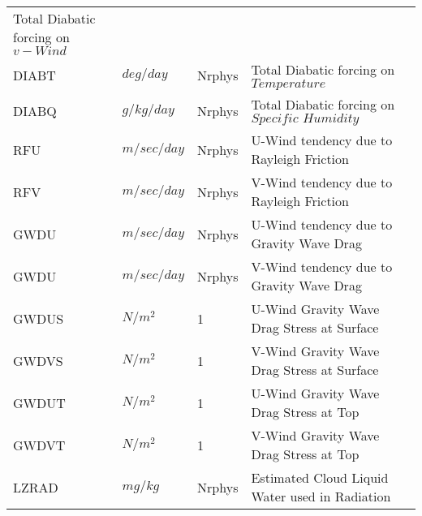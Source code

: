 \begin{tabular}{llll}
\begin{minipage}[t]{3in}
      {Total Diabatic forcing on $v-Wind$} 
     \end{minipage}\\
 DIABT    & $deg/day$ &    Nrphys
     &\begin{minipage}[t]{3in}
      {Total Diabatic forcing on $Temperature$} 
     \end{minipage}\\
 DIABQ    & $g/kg/day$ &    Nrphys
     &\begin{minipage}[t]{3in}
      {Total Diabatic forcing on $Specific \, \, Humidity$} 
     \end{minipage}\\
 RFU      &    $m/sec/day$ &  Nrphys
     &\begin{minipage}[t]{3in}
      {U-Wind tendency due to Rayleigh Friction}
     \end{minipage}\\
 RFV      &    $m/sec/day$ &  Nrphys
     &\begin{minipage}[t]{3in}
      {V-Wind tendency due to Rayleigh Friction}
     \end{minipage}\\
 GWDU     &    $m/sec/day$ &  Nrphys
     &\begin{minipage}[t]{3in}
      {U-Wind tendency due to Gravity Wave Drag}
     \end{minipage}\\
 GWDU     &    $m/sec/day$ &  Nrphys
     &\begin{minipage}[t]{3in}
      {V-Wind tendency due to Gravity Wave Drag}
     \end{minipage}\\
 GWDUS    &    $N/m^2$ &  1
     &\begin{minipage}[t]{3in}
      {U-Wind Gravity Wave Drag Stress at Surface}
     \end{minipage}\\
 GWDVS    &    $N/m^2$ &  1
     &\begin{minipage}[t]{3in}
      {V-Wind Gravity Wave Drag Stress at Surface}
     \end{minipage}\\
 GWDUT    &    $N/m^2$ &  1
     &\begin{minipage}[t]{3in}
      {U-Wind Gravity Wave Drag Stress at Top}
     \end{minipage}\\
 GWDVT    &    $N/m^2$ &  1
     &\begin{minipage}[t]{3in}
      {V-Wind Gravity Wave Drag Stress at Top}
     \end{minipage}\\
 LZRAD    &    $mg/kg$ &  Nrphys
         &\begin{minipage}[t]{3in}
          {Estimated Cloud Liquid Water used in Radiation}
         \end{minipage}\\
\end{tabular}
\vfill


